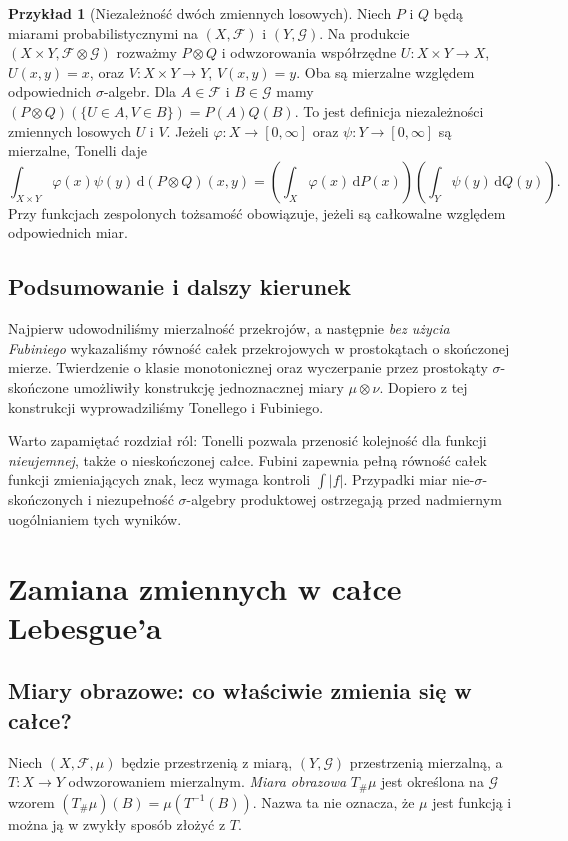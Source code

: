 \documentclass[11pt,a4paper,oneside]{book}
\numberwithin{equation}{chapter}
\theoremstyle{plain}
\theoremstyle{definition}
\newtheorem{przyklad}[twierdzenie]{Przykład}
\theoremstyle{remark}
\begin{document}
\begin{przyklad}[Niezależność dwóch zmiennych losowych]
Niech $P$ i $Q$ będą miarami probabilistycznymi
na $(X,\mathcal F)$ i $(Y,\mathcal G)$.
Na produkcie $(X\times Y,\mathcal F\otimes\mathcal G)$
rozważmy $P\otimes Q$ i odwzorowania współrzędne
$U:X\times Y\to X$, $U(x,y)=x$, oraz
$V:X\times Y\to Y$, $V(x,y)=y$.
Oba są mierzalne względem odpowiednich $\sigma$-algebr.
Dla $A\in\mathcal F$ i $B\in\mathcal G$
mamy
$(P\otimes Q)(\{U\in A,V\in B\})=P(A)Q(B)$.
To jest definicja niezależności zmiennych losowych
$U$ i $V$. Jeżeli $\varphi:X\to[0,\infty]$ oraz
$\psi:Y\to[0,\infty]$ są mierzalne, Tonelli daje
\[
\int_{X\times Y}\varphi(x)\psi(y)
\,\mathrm d(P\otimes Q)(x,y)
=\left(\int_X\varphi(x)\,\mathrm dP(x)\right)
\left(\int_Y\psi(y)\,\mathrm dQ(y)\right).
\]
Przy funkcjach zespolonych tożsamość obowiązuje,
jeżeli są całkowalne względem odpowiednich miar.
\end{przyklad}

\section{Podsumowanie i dalszy kierunek}
Najpierw udowodniliśmy mierzalność przekrojów,
a następnie \emph{bez użycia Fubiniego} wykazaliśmy
równość całek przekrojowych w prostokątach o
skończonej mierze. Twierdzenie o klasie monotonicznej
oraz wyczerpanie przez prostokąty $\sigma$-skończone
umożliwiły konstrukcję jednoznacznej miary
$\mu\otimes\nu$. Dopiero z tej konstrukcji
wyprowadziliśmy Tonellego i Fubiniego.

Warto zapamiętać rozdział ról: Tonelli pozwala
przenosić kolejność dla funkcji \emph{nieujemnej},
także o nieskończonej całce. Fubini zapewnia
pełną równość całek funkcji zmieniających znak,
lecz wymaga kontroli $\int|f|$. Przypadki
miar nie-$\sigma$-skończonych i niezupełność
$\sigma$-algebry produktowej ostrzegają przed
nadmiernym uogólnianiem tych wyników.



\chapter{Zamiana zmiennych w całce Lebesgue'a}
\label{ch:zamiana-zmiennych}

\section{Miary obrazowe: co właściwie zmienia się w całce?}
Niech $(X,\mathcal F,\mu)$ będzie przestrzenią z miarą, $(Y,\mathcal G)$
przestrzenią mierzalną, a $T:X\to Y$ odwzorowaniem mierzalnym.
\emph{Miara obrazowa} $T_\#\mu$ jest określona na $\mathcal G$ wzorem
$(T_\#\mu)(B)=\mu(T^{-1}(B))$. Nazwa ta nie oznacza, że
$\mu$ jest funkcją i można ją w zwykły sposób złożyć z $T$.
\end{document}
